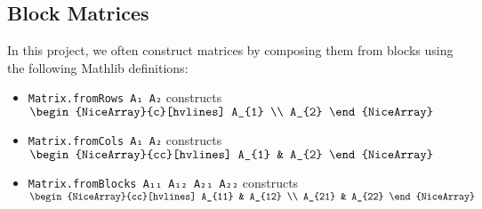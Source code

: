 \subsection{Block Matrices}

In this project, we often construct matrices by composing them from blocks using the following Mathlib definitions:
\begin{itemize}
    \item \texttt{Matrix.fromRows A₁ A₂} constructs
    $\begin{NiceArray}{c}[hvlines]
       A_{1} \\
       A_{2}
    \end{NiceArray}$
    \item \texttt{Matrix.fromCols A₁ A₂} constructs
    $\begin{NiceArray}{cc}[hvlines]
       A_{1} & A_{2}
    \end{NiceArray}$
    \item \texttt{Matrix.fromBlocks A₁₁ A₁₂ A₂₁ A₂₂} constructs\newline
    $\begin{NiceArray}{cc}[hvlines]
       A_{11} & A_{12} \\
       A_{21} & A_{22}
    \end{NiceArray}$
\end{itemize}
